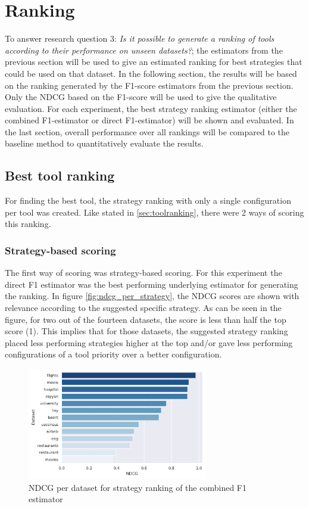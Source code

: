 \newpage
\section{Ranking}
To answer research question 3: \textit{Is it possible to generate a ranking of tools according to their performance on unseen datasets?}; the estimators from the previous section will be used to give an estimated ranking for best strategies that could be used on that dataset. In the following section, the results will be based on the ranking generated by the F1-score estimators from the previous section. Only the NDCG based on the F1-score will be used to give the qualitative evaluation. For each experiment, the best strategy ranking estimator (either the combined F1-estimator or direct F1-estimator) will be shown and evaluated. In the last section, overall performance over all rankings will be compared to the baseline method to quantitatively evaluate the results.

\subsection{Best tool ranking}
For finding the best tool, the strategy ranking with only a single configuration per tool was created. Like stated in \autoref{sec:toolranking}, there were 2 ways of scoring this ranking. 

\subsubsection{Strategy-based scoring}
The first way of scoring was strategy-based scoring. For this experiment the direct F1 estimator was the best performing underlying estimator for generating the ranking. In figure \autoref{fig:ndcg_per_strategy}, the NDCG scores are shown with relevance according to the suggested specific strategy.
As can be seen in the figure, for two out of the fourteen datasets, the score is less than half the top score (1). This implies that for those datasets, the suggested strategy ranking placed less performing strategies higher at the top and/or gave less performing configurations of a tool priority over a better configuration. 

\begin{figure}[H]
    \centering
    \includegraphics[width=0.7\textwidth]{thesis/Figures/RQ3/15_ranking_ndcg_combined_f1.pdf}
    \caption{NDCG per dataset for strategy ranking of the combined F1 estimator}
    \label{fig:ndcg_per_strategy}
\end{figure}


